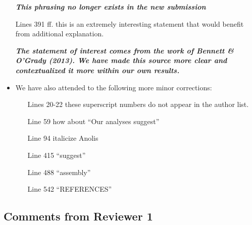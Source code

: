 \documentclass[12pt]{article}
\begin{document}
\begin{itemize}
  \textit{\textbf{This phrasing no longer exists in the new submission}}
%
\item[Lines 391 ff.] this is an extremely interesting statement that
  would benefit from additional explanation.

  \textit{\textbf{The statement of interest comes from the work of
      Bennett \& O'Grady (2013). We have made this source more clear
      and contextualized it more within our own results.}}

\item We have also attended to the following more minor corrections: 
  \begin{itemize}
  \item[Lines 20-22] these superscript numbers do not appear in the
    author list.
  \item[Line 59] how about ``Our analyses suggest''
  \item[Line 94] italicize Anolis
  \item[Line 415] ``suggest''
  \item[Line 488] ``assembly''
  \item[Line 542] ``REFERENCES''
  \end{itemize}
\end{itemize}


\subsection*{Comments from Reviewer 1}
\end{document}
